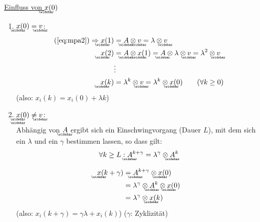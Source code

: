 \underline{Einfluss von $\wbar{x}(0)$}
\begin{enumerate}[label=(\alph*)]
	\item $\wbar{x}(0)=\wbar{v}$:\\
		\begin{align}
			(\ref{eq:mpa2}) \Rightarrow \wbar{x}(1) &= \wbar{A} \otimes \wbar{v} = \lambda \otimes \wbar{v} \\
			\wbar{x}(2) &= \wbar{A} \otimes \wbar{x}(1) = \wbar{A} \otimes \lambda \otimes \wbar{v} = \lambda^2 \otimes \wbar{v} \\
			&\vdots \nonumber \\
			\wbar{x}(k) &= \lambda^k \otimes \wbar{v} = \lambda^k \otimes \wbar{x}(0) \qquad (\forall k \ge 0)
		\end{align}
		(also: $x_i(k)=x_i(0)+\lambda k$)
	
	\item $\wbar{\wbar{x}}(0)\neq\wbar{v}$:\\
		Abhängig von $\wbar{A}$ ergibt sich ein Einschwingvorgang (Dauer $L$), mit dem sich ein $\lambda$ und ein $\gamma$ bestimmen lassen, so dass gilt:
		\begin{equation}
			\forall k \ge L : \wbar{A}^{k + \gamma} = \lambda^\gamma \otimes \wbar{A}^k
		\end{equation}
		
		\begin{align}
			\wbar{x}(k+\gamma) &= \wbar{A}^{k+\gamma} \otimes \wbar{x}(0)\\
			            &= \lambda^\gamma \otimes \wbar{A}^k \otimes \wbar{x}(0) \\
			            &= \lambda^\gamma \otimes \wbar{x}(k)
		\end{align}
		(also: $x_i(k+\gamma) = \gamma \lambda + x_i(k)$)
		($\gamma$: Zyklizität)
\end{enumerate}















